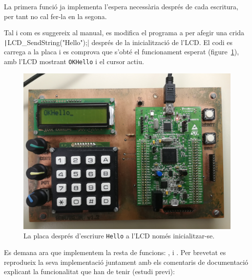 La primera funció ja implementa l'espera necessària després de cada escritura, per
tant no cal fer-la en la segona.

Tal i com es suggereix al manual, es modifica el programa a  per afegir una crida
\texttt|LCD_SendString("Hello");| després de la inicialització de l'LCD.
El codi es carrega a la placa i es comprova que s'obté el funcionament esperat
(figure~\ref{fig:p2-board-hello}), amb l'LCD mostrant \texttt{OKHello} i el
cursor actiu.

\begin{figure}
  \begin{center}
    \includegraphics[width=1\columnwidth]{../photos/board/p2-hello}
  \end{center}
  \caption{ \label{fig:p2-board-hello} La placa després d'escriure \texttt{Hello} a l'LCD només inicialitzar-se. }
\end{figure}

Es demana ara que implementem la resta de funcions: ,
 i . Per brevetat es reprodueix la seva
implementació juntament amb els comentaris de documentació explicant la
funcionalitat que han de tenir (estudi previ):

